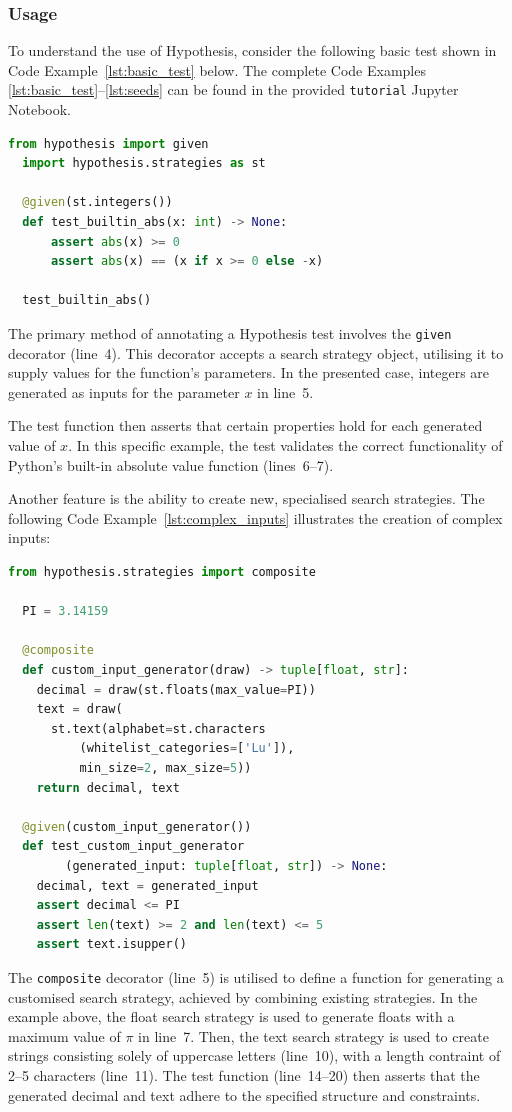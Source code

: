 \documentclass[runningheads]{llncs}
\begin{document}
\subsubsection{Usage}
To understand the use of Hypothesis, consider the following basic test shown in Code Example~\ref{lst:basic_test} below. The complete Code Examples \ref{lst:basic_test}--\ref{lst:seeds} can be found in the provided \texttt{tutorial} Jupyter Notebook.
\begin{lstlisting}[language=Python,caption={Basic Test from \texttt{tutorial.ipynb}},label=lst:basic_test]
  from hypothesis import given
  import hypothesis.strategies as st

  @given(st.integers())
  def test_builtin_abs(x: int) -> None:
      assert abs(x) >= 0
      assert abs(x) == (x if x >= 0 else -x)

  test_builtin_abs()
\end{lstlisting}
The primary method of annotating a Hypothesis test involves the \texttt{given} decorator (line~4). This decorator accepts a search strategy object, utilising it to supply values for the function's parameters. In the presented case, integers are generated as inputs for the parameter $x$ in line~5.

The test function then asserts that certain properties hold for each generated value of $x$. In this specific example, the test validates the correct functionality of Python's built-in absolute value function (lines~6--7).

\vspace{5mm}
\noindent Another feature is the ability to create new, specialised search strategies. The following Code Example~\ref{lst:complex_inputs} illustrates the creation of complex inputs:

\begin{lstlisting}[language=Python,caption={Complex Inputs from \texttt{tutorial.ipynb}},label=lst:complex_inputs]
  from hypothesis.strategies import composite

  PI = 3.14159

  @composite
  def custom_input_generator(draw) -> tuple[float, str]:
    decimal = draw(st.floats(max_value=PI))
    text = draw(
      st.text(alphabet=st.characters
          (whitelist_categories=['Lu']),
          min_size=2, max_size=5))
    return decimal, text

  @given(custom_input_generator())
  def test_custom_input_generator
        (generated_input: tuple[float, str]) -> None:
    decimal, text = generated_input
    assert decimal <= PI
    assert len(text) >= 2 and len(text) <= 5
    assert text.isupper()
\end{lstlisting}
The \texttt{composite} decorator (line~5) is utilised to define a function for generating a customised search strategy, achieved by combining existing strategies. In the example above, the float search strategy is used to generate floats with a maximum value of $\pi$ in line~7. Then, the text search strategy is used to create strings consisting solely of uppercase letters (line~10), with a length contraint of 2--5 characters (line~11). The test function (line~14--20) then asserts that the generated decimal and text adhere to the specified structure and constraints.
\end{document}
